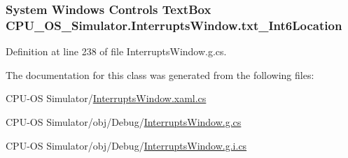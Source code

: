\subsubsection[{txt\+\_\+\+Int6\+Location}]{\setlength{\rightskip}{0pt plus 5cm}System Windows Controls Text\+Box C\+P\+U\+\_\+\+O\+S\+\_\+\+Simulator.\+Interrupts\+Window.\+txt\+\_\+\+Int6\+Location\hspace{0.3cm}{\ttfamily [package]}}\label{class_c_p_u___o_s___simulator_1_1_interrupts_window_a3622031e734f3b4fef38625509650396}


Definition at line 238 of file Interrupts\+Window.\+g.\+cs.



The documentation for this class was generated from the following files\+:\begin{DoxyCompactItemize}
\item 
C\+P\+U-\/\+O\+S Simulator/\hyperlink{_interrupts_window_8xaml_8cs}{Interrupts\+Window.\+xaml.\+cs}\item 
C\+P\+U-\/\+O\+S Simulator/obj/\+Debug/\hyperlink{_interrupts_window_8g_8cs}{Interrupts\+Window.\+g.\+cs}\item 
C\+P\+U-\/\+O\+S Simulator/obj/\+Debug/\hyperlink{_interrupts_window_8g_8i_8cs}{Interrupts\+Window.\+g.\+i.\+cs}\end{DoxyCompactItemize}
